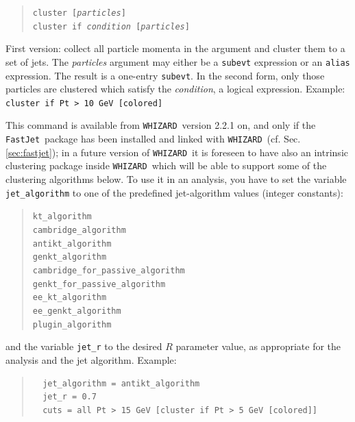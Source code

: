 \documentclass[12pt]{book}
\newcommand{\ttt}[1]{\texttt{#1}}
\newcommand{\whizard}{\ttt{WHIZARD}}
\newcommand{\fastjet}{\ttt{FastJet}}
\begin{document}
\begin{quote}
\begin{footnotesize}
  \ttt{cluster [\textit{particles}]} \\
  \ttt{cluster if \textit{condition} [\textit{particles}]} \\
\end{footnotesize}
\end{quote}
First version: collect all particle momenta in the argument and cluster them
to a set of jets.  The \textit{particles} argument may either be a
\ttt{subevt} expression or an \ttt{alias} expression.  The result is a
one-entry \ttt{subevt}.  In the second form, only those particles are clustered
which satisfy the \textit{condition}, a logical expression.  Example:
\ttt{cluster if Pt > 10 GeV [colored]}


This command is available from \whizard\ version 2.2.1 on, and only if
the \fastjet\ package has been installed and linked with \whizard\
(cf. Sec.\ref{sec:fastjet}); in a future version of \whizard\ it is
foreseen to have also an intrinsic clustering package inside \whizard\
which will be able to support some of the clustering algorithms
below. To use it in an analysis, you have to set the variable
\ttt{jet\_algorithm} to one of the predefined jet-algorithm values
(integer constants):
\begin{quote}
\begin{footnotesize}
  \ttt{kt\_algorithm}\\
  \ttt{cambridge\_algorithm}\\
  \ttt{antikt\_algorithm}\\
  \ttt{genkt\_algorithm}\\
  \ttt{cambridge\_for\_passive\_algorithm}\\
  \ttt{genkt\_for\_passive\_algorithm}\\
  \ttt{ee\_kt\_algorithm}\\
  \ttt{ee\_genkt\_algorithm}\\
  \ttt{plugin\_algorithm}
\end{footnotesize}
\end{quote}
and the variable \ttt{jet\_r} to the desired $R$ parameter value, as
appropriate for the analysis and the jet algorithm.  Example:
\begin{quote}
\begin{footnotesize}
\begin{verbatim}
  jet_algorithm = antikt_algorithm
  jet_r = 0.7
  cuts = all Pt > 15 GeV [cluster if Pt > 5 GeV [colored]]
\end{verbatim}
\end{footnotesize}
\end{quote}
\end{document}
